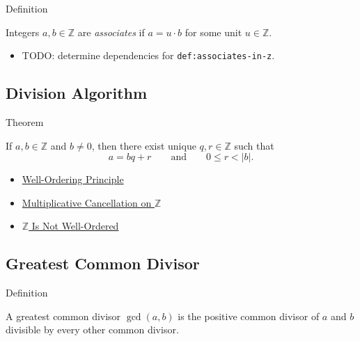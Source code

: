 \begin{definitionbox}{Definition}
\begin{definition}
\label{def:associates-in-z}
Integers $a,b\in\mathbb{Z}$ are \emph{associates} if $a=u\cdot b$ for some
unit $u\in\mathbb{Z}$.
\end{definition}
\end{definitionbox}

\begin{dependencies}
\begin{itemize}
  \item TODO: determine dependencies for \texttt{def:associates-in-z}.
\end{itemize}
\end{dependencies}

\subsection*{Division Algorithm}

\begin{theorembox}{Theorem}
\begin{theorem}
\label{thm:division-algorithm-on-z}
If $a,b\in\mathbb{Z}$ and $b\ne0$, then there exist unique
$q,r\in\mathbb{Z}$ such that
\[
a=bq+r
\qquad\text{and}\qquad
0\le r<|b|.
\]
\end{theorem}
\end{theorembox}

\begin{dependencies}
\begin{itemize}
  \item \hyperref[thm:well-ordering-principle]{Well-Ordering Principle}
  \item \hyperref[cor:multiplicative-cancellation-on-z]{Multiplicative Cancellation on $\mathbb{Z}$}
  \item \hyperref[thm:z-is-not-well-ordered]{$\mathbb{Z}$ Is Not Well-Ordered}
\end{itemize}
\end{dependencies}

\subsection*{Greatest Common Divisor}

\begin{definitionbox}{Definition}
\begin{definition}
\label{def:greatest-common-divisor-in-z}
A greatest common divisor $\gcd(a,b)$ is the positive common divisor of
$a$ and $b$ divisible by every other common divisor.
\end{definition}
\end{definitionbox}

